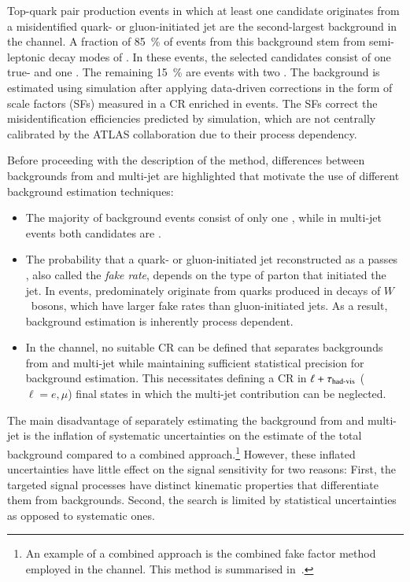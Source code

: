 Top-quark pair production events in which at least one \tauhadvis candidate
originates from a misidentified quark- or gluon-initiated jet are the
second-largest background in the \hadhad channel. A fraction of
\SI{85}{\percent} of events from this background stem from semi-leptonic decay
modes of \ttbar. In these events, the selected \tauhadvis candidates consist of
one true- and one \faketauhadvis. The remaining \SI{15}{\percent} are
\ttbarFakes events with two \faketauhadvis.
The \ttbarFakes background is estimated using simulation after applying
data-driven corrections in the form of \faketauhadvis scale factors (SFs)
measured in a CR enriched in \ttbar events. The SFs correct the \jettotauhadvis
misidentification efficiencies predicted by simulation, which are not centrally
calibrated by the ATLAS collaboration due to their process dependency.

Before proceeding with the description of the method, differences between
\faketauhadvis backgrounds from \ttbar and multi-jet are highlighted that
motivate the use of different background estimation techniques:
\begin{itemize}

\item The majority of \ttbarFakes background events consist of only one
  \faketauhadvis, while in multi-jet events both candidates are \faketauhadvis.

\item The probability that a quark- or gluon-initiated jet reconstructed as a
  \tauhadvis passes \tauid, also called the \emph{fake rate}, depends on the
  type of parton that initiated the jet. In \ttbar events, \faketauhadvis
  predominately originate from quarks produced in decays of $W$~bosons, which
  have larger fake rates than gluon-initiated jets. As a result, \faketauhadvis
  background estimation is inherently process dependent.

\item In the \hadhad channel, no suitable \ttbarFakes CR can be defined that
  separates \faketauhadvis backgrounds from \ttbar and multi-jet while
  maintaining sufficient statistical precision for background estimation. This
  necessitates defining a CR in $\ell + \tau_{\text{had-vis}}$ ($\ell = e, \mu$) final
  states in which the multi-jet contribution can be neglected.

\end{itemize}
The main disadvantage of separately estimating the \faketauhadvis background
from \ttbar and multi-jet is the inflation of systematic uncertainties on the
estimate of the total \faketauhadvis background compared to a combined
approach.\footnote{An example of a combined approach is the combined fake factor
  method employed in the \lephad channel. This method is summarised
  in~.}  However, these inflated uncertainties
have little effect on the signal sensitivity for two reasons: First, the
targeted signal processes have distinct kinematic properties that differentiate
them from \faketauhadvis backgrounds. Second, the search is limited by
statistical uncertainties as opposed to systematic ones.


